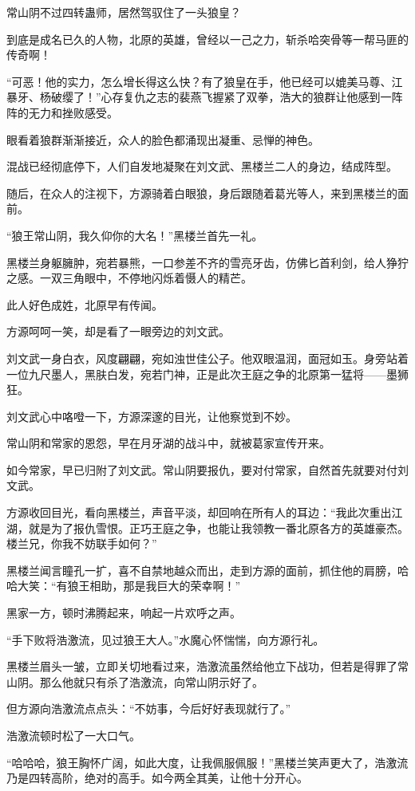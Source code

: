 \begin{this_body}
常山阴不过四转蛊师，居然驾驭住了一头狼皇？

到底是成名已久的人物，北原的英雄，曾经以一己之力，斩杀哈突骨等一帮马匪的传奇啊！

“可恶！他的实力，怎么增长得这么快？有了狼皇在手，他已经可以媲美马尊、江暴牙、杨破缨了！”心存复仇之志的裴燕飞握紧了双拳，浩大的狼群让他感到一阵阵的无力和挫败感受。

眼看着狼群渐渐接近，众人的脸色都涌现出凝重、忌惮的神色。

混战已经彻底停下，人们自发地凝聚在刘文武、黑楼兰二人的身边，结成阵型。

随后，在众人的注视下，方源骑着白眼狼，身后跟随着葛光等人，来到黑楼兰的面前。

“狼王常山阴，我久仰你的大名！”黑楼兰首先一礼。

黑楼兰身躯臃肿，宛若暴熊，一口参差不齐的雪亮牙齿，仿佛匕首利剑，给人狰狞之感。一双三角眼中，不停地闪烁着慑人的精芒。

此人好色成姓，北原早有传闻。

方源呵呵一笑，却是看了一眼旁边的刘文武。

刘文武一身白衣，风度翩翩，宛如浊世佳公子。他双眼温润，面冠如玉。身旁站着一位九尺墨人，黑肤白发，宛若门神，正是此次王庭之争的北原第一猛将——墨狮狂。

刘文武心中咯噔一下，方源深邃的目光，让他察觉到不妙。

常山阴和常家的恩怨，早在月牙湖的战斗中，就被葛家宣传开来。

如今常家，早已归附了刘文武。常山阴要报仇，要对付常家，自然首先就要对付刘文武。

方源收回目光，看向黑楼兰，声音平淡，却回响在所有人的耳边：“我此次重出江湖，就是为了报仇雪恨。正巧王庭之争，也能让我领教一番北原各方的英雄豪杰。楼兰兄，你我不妨联手如何？”

黑楼兰闻言瞳孔一扩，喜不自禁地越众而出，走到方源的面前，抓住他的肩膀，哈哈大笑：“有狼王相助，那是我巨大的荣幸啊！”

黑家一方，顿时沸腾起来，响起一片欢呼之声。

“手下败将浩激流，见过狼王大人。”水魔心怀惴惴，向方源行礼。

黑楼兰眉头一皱，立即关切地看过来，浩激流虽然给他立下战功，但若是得罪了常山阴。那么他就只有杀了浩激流，向常山阴示好了。

但方源向浩激流点点头：“不妨事，今后好好表现就行了。”

浩激流顿时松了一大口气。

“哈哈哈，狼王胸怀广阔，如此大度，让我佩服佩服！”黑楼兰笑声更大了，浩激流乃是四转高阶，绝对的高手。如今两全其美，让他十分开心。


\end{this_body}
